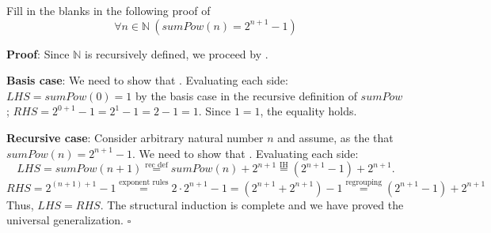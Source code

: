 \documentclass[12pt, oneside]{article}
\begin{document}
Fill in the blanks in the following proof of 
\[
    \forall n \in \mathbb{N}~(sumPow(n) = 2^{n+1} - 1)
\]

{\bf Proof}: Since $\mathbb{N}$ is recursively defined, we proceed by \underline{}.

{\bf Basis case}: We need to show that \underline{}.
Evaluating each side: $LHS = sumPow(0) = 1$ by the basis case in the recursive definition
of $sumPow$; $RHS = 2^{0+1} - 1 = 2^1 - 1 = 2-1 = 1$. Since $1=1$, the equality holds.

{\bf Recursive case}: Consider arbitrary natural number $n$ and assume, as the 
\underline{\phantom{Induction Hypothesis (IH)}} that $sumPow(n) = 2^{n+1} - 1$. We need to show that
\underline{}.  Evaluating each side: 
\[
LHS = sumPow(n+1) \overset{\text{rec def}}{=} sumPow(n)  + 2^{n+1}\overset{\text{IH}}{=} (2^{n+1} - 1) + 2^{n+1}.
\]
\[
RHS = 2^{(n+1)+1}- 1 \overset{\text{exponent rules}}{=} 2 \cdot 2^{n+1} -1  = \left(2^{n+1} + 2^{n+1} \right) - 1
\overset{\text{regrouping}}{=}  (2^{n+1} - 1) + 2^{n+1} 
\]
Thus, $LHS = RHS$. The structural induction is complete and we have proved the universal generalization.
$\square$

 \vfill


 \newpage
\end{document}
